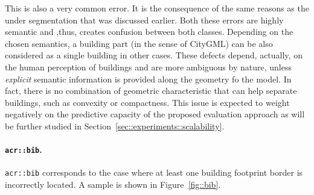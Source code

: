                 This is also a very common error.
                It is the consequence of the same reasons as the under segmentation that was discussed earlier.
                Both these errors are highly semantic and ,thus, creates confusion between both classes.
                Depending on the chosen semantics, a building part (in the sense of CityGML) can be also considered as a single building in other cases.
                These defects depend, actually, on the human perception of buildings and are more ambiguous by nature, unless \textit{explicit} semantic information is provided along the geometry fo the model.
                In fact, there is no combination of geometric characteristic that can help separate buildings, such as convexity or compactness.
                This issue is expected to weight negatively on the predictive capacity of the proposed evaluation approach as will be further studied in Section~\ref{sec::experiments::scalability}.

            \paragraph{\texttt{\acrlong*{acr::bib}}.}
                \texttt{\gls{acr::bib}} corresponds to the case where at least one building footprint border is incorrectly located.
                A sample is shown in Figure~\ref{fig::bib}.\\

                \begin{figure}[htb]
                    \centering
                \end{figure}

